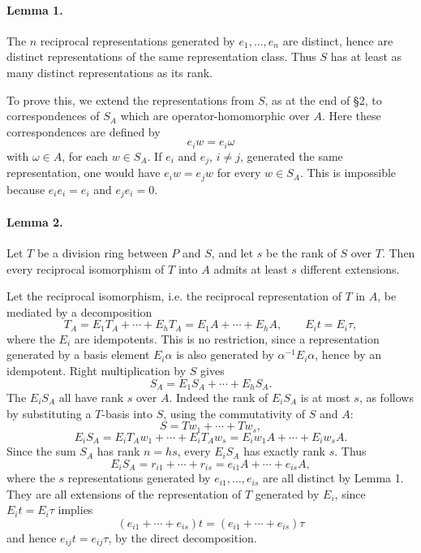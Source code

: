 \documentclass[11pt]{article}
\begin{document}
\paragraph{Lemma 1.}
The \(n\) reciprocal representations generated by \(e_1,\ldots,e_n\) are distinct, hence are distinct representations of the same representation class. Thus \(S\) has at least as many distinct representations as its rank.

To prove this, we extend the representations from \(S\), as at the end of §2, to correspondences of \(S_A\) which are operator-homomorphic over \(A\). Here these correspondences are defined by
\[
        e_iw=e_i\omega
\]
with \(\omega\in A\), for each \(w\in S_A\). If \(e_i\) and \(e_j\), \(i\ne j\), generated the same representation, one would have \(e_iw=e_jw\) for every \(w\in S_A\). This is impossible because \(e_ie_i=e_i\) and \(e_je_i=0\).

\paragraph{Lemma 2.}
Let \(T\) be a division ring between \(P\) and \(S\), and let \(s\) be the rank of \(S\) over \(T\). Then every reciprocal isomorphism of \(T\) into \(A\) admits at least \(s\) different extensions.

Let the reciprocal isomorphism, i.e. the reciprocal representation of \(T\) in \(A\), be mediated by a decomposition
\[
        T_A=E_1T_A+\cdots+E_hT_A
            =E_1A+\cdots+E_hA,
        \qquad E_it=E_i\tau ,
\]
where the \(E_i\) are idempotents. This is no restriction, since a representation generated by a basis element \(E_i\alpha\) is also generated by \(\alpha^{-1}E_i\alpha\), hence by an idempotent. Right multiplication by \(S\) gives
\[
        S_A=E_1S_A+\cdots+E_hS_A .
\]
The \(E_iS_A\) all have rank \(s\) over \(A\). Indeed the rank of \(E_iS_A\) is at most \(s\), as follows by substituting a \(T\)-basis into \(S\), using the commutativity of \(S\) and \(A\):
\[
        S=Tw_1+\cdots+Tw_s,
\]
\[
        E_iS_A=E_iT_Aw_1+\cdots+E_iT_Aw_s
              =E_iw_1A+\cdots+E_iw_sA .
\]
Since the sum \(S_A\) has rank \(n=hs\), every \(E_iS_A\) has exactly rank \(s\). Thus
\[
        E_iS_A=r_{i1}+\cdots+r_{is}
              =e_{i1}A+\cdots+e_{is}A,
\]
where the \(s\) representations generated by \(e_{i1},\ldots,e_{is}\) are all distinct by Lemma 1. They are all extensions of the representation of \(T\) generated by \(E_i\), since \(E_it=E_i\tau\) implies
\[
        (e_{i1}+\cdots+e_{is})t=(e_{i1}+\cdots+e_{is})\tau
\]
and hence \(e_{ij}t=e_{ij}\tau\), by the direct decomposition.
\end{document}

